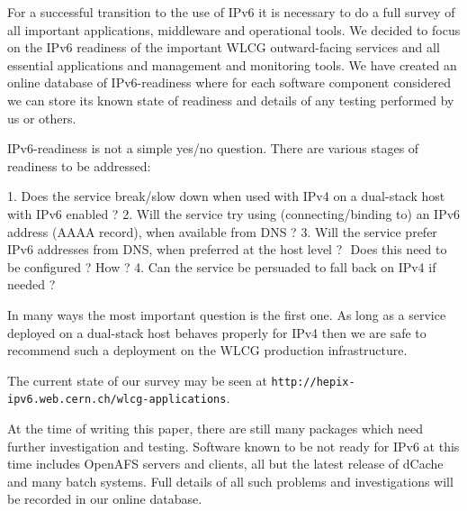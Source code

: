 For a successful transition to the use of IPv6 it is necessary to do a full survey of all important applications, middleware and operational tools. We decided to focus on the IPv6 readiness of the important WLCG outward-facing services and all essential applications and management and monitoring tools. We have created an online database of IPv6-readiness where for each software component considered we can store its known state of readiness and details of any testing performed by us or others.

IPv6-readiness is not a simple yes/no question. There are various stages of readiness to be addressed:

	1.	Does the service break/slow down when used with IPv4 on a dual-stack host with IPv6 enabled ?
	2.	Will the service try using (connecting/binding to) an IPv6 address (AAAA record), when available from DNS ?
	3.	Will the service prefer IPv6 addresses from DNS, when preferred at the host level ?  Does this need to be configured ? How ?
	4.	Can the service be persuaded to fall back on IPv4 if needed ?

In many ways the most important question is the first one. As long as a service deployed on a dual-stack host behaves properly for IPv4 then we are safe to recommend such a deployment on the WLCG production infrastructure.

The current state of our survey may be seen at {\tt http://hepix-ipv6.web.cern.ch/wlcg-applications}.

At the time of writing this paper, there are still many packages which need further investigation and testing.
Software known to be not ready for IPv6 at this time includes OpenAFS servers and clients, all but the latest release of dCache and many batch systems. Full details of all such problems and investigations will be recorded in our online database.


